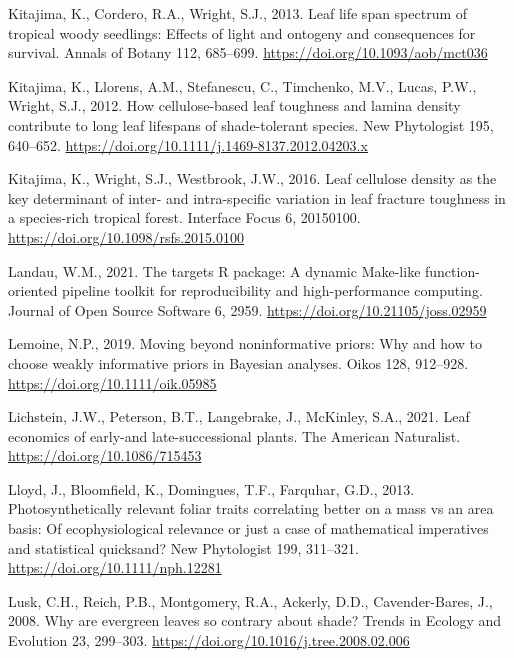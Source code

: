 \documentclass[
  12pt,
  letterpaper,
  DIV=11,
  numbers=noendperiod]{scrartcl}
\newlength{\cslhangindent}
\newenvironment{CSLReferences}[2] %
 {\begin{list}{}{%
  \setlength{\itemindent}{0pt}
  \setlength{\leftmargin}{0pt}
  \setlength{\parsep}{0pt}
  \ifodd #1
   \setlength{\leftmargin}{\cslhangindent}
   \setlength{\itemindent}{-1\cslhangindent}
  \fi
  \setlength{\itemsep}{#2\baselineskip}}}
 {\end{list}}
\begin{document}
\begin{CSLReferences}{1}{0}
Kitajima, K., Cordero, R.A., Wright, S.J., 2013. Leaf life span spectrum
of tropical woody seedlings: {Effects} of light and ontogeny and
consequences for survival. Annals of Botany 112, 685--699.
\url{https://doi.org/10.1093/aob/mct036}

Kitajima, K., Llorens, A.M., Stefanescu, C., Timchenko, M.V., Lucas,
P.W., Wright, S.J., 2012. How cellulose-based leaf toughness and lamina
density contribute to long leaf lifespans of shade-tolerant species. New
Phytologist 195, 640--652.
\url{https://doi.org/10.1111/j.1469-8137.2012.04203.x}

Kitajima, K., Wright, S.J., Westbrook, J.W., 2016. Leaf cellulose
density as the key determinant of inter- and intra-specific variation in
leaf fracture toughness in a species-rich tropical forest. Interface
Focus 6, 20150100. \url{https://doi.org/10.1098/rsfs.2015.0100}

Landau, W.M., 2021. The targets {R} package: A dynamic {Make-like}
function-oriented pipeline toolkit for reproducibility and
high-performance computing. Journal of Open Source Software 6, 2959.
\url{https://doi.org/10.21105/joss.02959}

Lemoine, N.P., 2019. Moving beyond noninformative priors: Why and how to
choose weakly informative priors in {Bayesian} analyses. Oikos 128,
912--928. \url{https://doi.org/10.1111/oik.05985}

Lichstein, J.W., Peterson, B.T., Langebrake, J., McKinley, S.A., 2021.
Leaf economics of early-and late-successional plants. The American
Naturalist. \url{https://doi.org/10.1086/715453}

Lloyd, J., Bloomfield, K., Domingues, T.F., Farquhar, G.D., 2013.
Photosynthetically relevant foliar traits correlating better on a mass
vs an area basis: {Of} ecophysiological relevance or just a case of
mathematical imperatives and statistical quicksand? New Phytologist 199,
311--321. \url{https://doi.org/10.1111/nph.12281}

Lusk, C.H., Reich, P.B., Montgomery, R.A., Ackerly, D.D.,
Cavender-Bares, J., 2008. Why are evergreen leaves so contrary about
shade? Trends in Ecology and Evolution 23, 299--303.
\url{https://doi.org/10.1016/j.tree.2008.02.006}


\end{CSLReferences}
\end{document}
